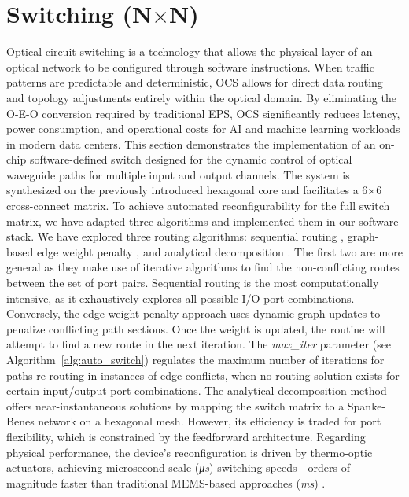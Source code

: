 \section{Switching (N$\times$N)}\label{sec:switches}
Optical circuit switching is a technology that allows the physical layer of an optical network to be configured through software instructions.
When traffic patterns are predictable and deterministic, OCS allows for direct data routing and topology adjustments entirely within the optical domain.
By eliminating the O-E-O conversion required by traditional EPS, OCS significantly reduces latency, power consumption, and operational costs for AI and machine learning workloads in modern data centers.
This section demonstrates the implementation of an on-chip software-defined switch designed for the dynamic control of optical waveguide paths for multiple input and output channels.
The system is synthesized on the previously introduced hexagonal core and facilitates a 6$\times$6 cross-connect matrix.
To achieve automated reconfigurability for the full switch matrix, we have adapted three algorithms and implemented them in our software stack.
We have explored three routing algorithms: sequential routing \cite{lopez2020auto}, graph-based edge weight penalty \cite{vanden2023automated}, and analytical decomposition \cite{jia2018six}.
The first two are more general as they make use of iterative algorithms to find the non-conflicting routes between the set of port pairs.
Sequential routing is the most computationally intensive, as it exhaustively explores all possible I/O port combinations.
Conversely, the edge weight penalty approach uses dynamic graph updates to penalize conflicting path sections.
Once the weight is updated, the routine will attempt to find a new route in the next iteration.
The \textit{max\_iter} parameter (see Algorithm~\ref{alg:auto_switch}) regulates the maximum number of iterations for paths re-routing in instances of edge conflicts, when no routing solution exists for certain input/output port combinations.
The analytical decomposition method offers near-instantaneous solutions by mapping the switch matrix to a Spanke-Benes network on a hexagonal mesh.
However, its efficiency is traded for port flexibility, which is constrained by the feedforward architecture.
Regarding physical performance, the device's reconfiguration is driven by thermo-optic actuators, achieving microsecond-scale (\textit{μs}) switching speeds—orders of magnitude faster than traditional MEMS-based approaches (\textit{ms}) \cite{1244924}.
